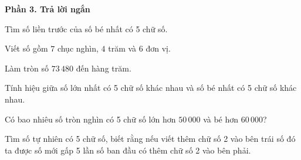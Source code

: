 \textbf{Phần 3. Trả lời ngắn}

\begin{ex} %
Tìm số liền trước của số bé nhất có 5 chữ số.
\end{ex}

\begin{ex} %
Viết số gồm $7$ chục nghìn, $4$ trăm và $6$ đơn vị.
\end{ex}

\begin{ex} %
Làm tròn số $73\,480$ đến hàng trăm.
\end{ex}

\begin{ex} %
Tính hiệu giữa số lớn nhất có 5 chữ số khác nhau và số bé nhất có 5 chữ số khác nhau.
\end{ex}

\begin{ex} %
Có bao nhiêu số tròn nghìn có 5 chữ số lớn hơn $50\,000$ và bé hơn $60\,000$?
\end{ex}

\begin{ex} %
Tìm số tự nhiên có 5 chữ số, biết rằng nếu viết thêm chữ số 2 vào bên trái số đó ta được số mới gấp 5 lần số ban đầu có thêm chữ số 2 vào bên phải.
\end{ex}

